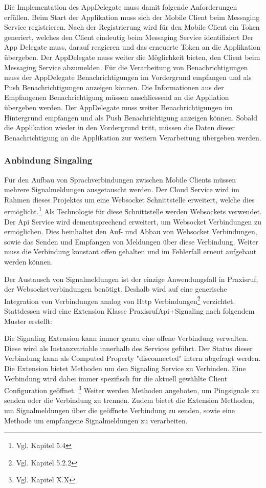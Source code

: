 Die Implementation des AppDelegate muss damit folgende Anforderungen erfüllen.
Beim Start der Applikation muss sich der Mobile Client beim Messaging Service registrieren.
Nach der Registrierung wird für den Mobile Client ein Token generiert, welches den Client eindeutig beim Messaging Service identifiziert
Der App Delegate muss, darauf reagieren und das erneuerte Token an die Applikation übergeben.
Der AppDelegate muss weiter die Möglichkeit bieten, den Client beim Messaging Service abzumelden.
Für die Verarbeitung von Benachrichtigungen muss der AppDelegate Benachrichtigungen im Vordergrund empfangen und als Push Benachrichtigungen anzeigen können.
Die Informationen aus der Empfangenen Benachrichtigung müssen anschliessend an die Appliation übergeben werden.
Der AppDelegate muss weiter Benachrichtigungen im Hintergrund empfangen und als Push Benachrichtigung anzeigen können.
Sobald die Applikation wieder in den Vordergrund tritt, müssen die Daten dieser Benachrichtigung an die Applikation zur weitern Verarbeitung übergeben werden.

\subsubsection{Anbindung Singaling}

Für den Aufbau von Sprachverbindungen zwischen Mobile Clients müssen mehrere Signalmeldungen ausgetauscht werden.
Der Cloud Service wird im Rahmen dieses Projektes um eine Websocket Schnittstelle erweitert, welche dies ermöglicht.\footnote{Vgl. Kapitel 5.4}
Als Technologie für diese Schnittstelle werden Websockets verwendet.
Der Api Service wird dementsprechend erweitert, um Websocket Verbindungen zu ermöglichen.
Dies beinhaltet den Auf- und Abbau von Websocket Verbindungen, sowie das Senden und Empfangen von Meldungen über diese Verbindung.
Weiter muss die Verbindung konstant offen gehalten und im Fehlerfall erneut aufgebaut werden können.

Der Austausch von Signalmeldungen ist der einzige Anwendungsfall in Praxisruf, der Websocketverbindungen benötigt.
Deshalb wird auf eine generische Integration von Verbindungen analog von Http Verbindungen\footnote{Vgl. Kapitel 5.2.2} verzichtet.
Stattdessen wird eine Extension Klasse PraxisrufApi+Signaling nach folgendem Muster erstellt:



Die Signaling Extension kann immer genau eine offene Verbindung verwalten.
Diese wird als Instanzvariable innerhalb des Services geführt.
Der Status dieser Verbindung kann als Computed Property "disconnected" intern abgefragt werden.
Die Extension bietet Methoden um den Signaling Service zu Verbinden.
Eine Verbindung wird dabei immer spezifisch für die aktuell gewählte Client Configuration geöffnet. \footnote{Vgl. Kapitel X.X}
Weiter werden Methoden angeboten, um Pingsignale zu senden oder die Verbindung zu trennen.
Zudem bietet die Extension Methoden, um Signalmeldungen über die geöffnete Verbindung zu senden,
sowie eine Methode um empfangene Signalmeldungen zu verarbeiten.

